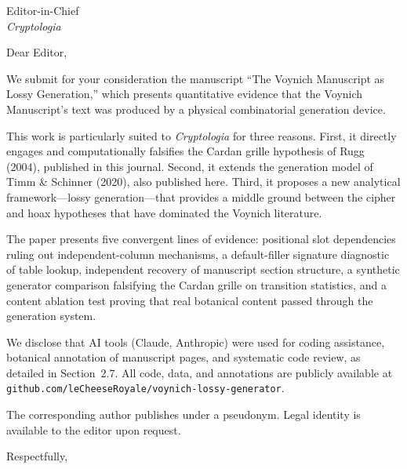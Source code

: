 \documentclass[12pt]{letter}
\begin{document}
\begin{letter}{Editor-in-Chief \\ \textit{Cryptologia}}
\opening{Dear Editor,}

We submit for your consideration the manuscript ``The Voynich Manuscript as Lossy Generation,'' which presents quantitative evidence that the Voynich Manuscript's text was produced by a physical combinatorial generation device.

This work is particularly suited to \textit{Cryptologia} for three reasons. First, it directly engages and computationally falsifies the Cardan grille hypothesis of Rugg (2004), published in this journal. Second, it extends the generation model of Timm \& Schinner (2020), also published here. Third, it proposes a new analytical framework---lossy generation---that provides a middle ground between the cipher and hoax hypotheses that have dominated the Voynich literature.

The paper presents five convergent lines of evidence: positional slot dependencies ruling out independent-column mechanisms, a default-filler signature diagnostic of table lookup, independent recovery of manuscript section structure, a synthetic generator comparison falsifying the Cardan grille on transition statistics, and a content ablation test proving that real botanical content passed through the generation system.

We disclose that AI tools (Claude, Anthropic) were used for coding assistance, botanical annotation of manuscript pages, and systematic code review, as detailed in Section~2.7. All code, data, and annotations are publicly available at \texttt{github.com/leCheeseRoyale/voynich-lossy-generator}.

The corresponding author publishes under a pseudonym. Legal identity is available to the editor upon request.

\closing{Respectfully,}
\end{letter}
\end{document}
